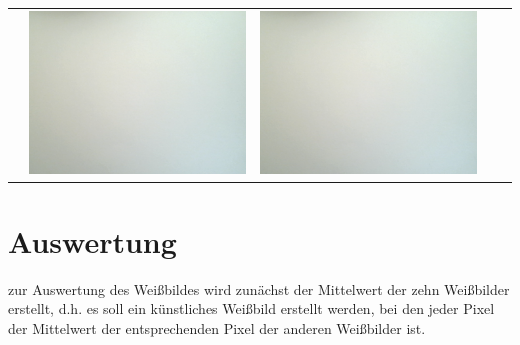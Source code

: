 \begin{tabular}{c c c c c}
 &
\includegraphics[scale=0.11]{media/weissbilder/weissbild_8.png}
 & 
\includegraphics[scale=0.11]{media/weissbilder/weissbild_9.png}
\end{tabular} 

\section{Auswertung}
\label{chap:VERSUCH_3_AUSWERTUNG}

zur Auswertung des Weißbildes wird zunächst der Mittelwert der zehn Weißbilder erstellt, d.h. es soll ein künstliches Weißbild erstellt werden, bei den jeder Pixel der Mittelwert der entsprechenden Pixel der anderen Weißbilder ist. 

